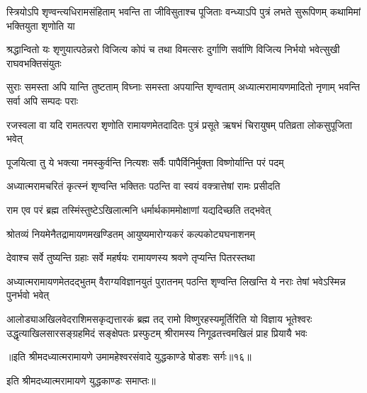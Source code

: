 \fourlineindentedshloka
{स्त्रियोऽपि शृण्वन्त्यधिरामसंहिताम्}
{भवन्ति ता जीविसुताश्च पूजिताः}
{वन्ध्याऽपि पुत्रं लभते सुरूपिणम्}
{कथामिमां भक्तियुता शृणोति या} %

\fourlineindentedshloka
{श्रद्धान्वितो यः शृणुयात्पठेन्नरो}
{विजित्य कोपं च तथा विमत्सरः}
{दुर्गाणि सर्वाणि विजित्य निर्भयो}
{भवेत्सुखी राघवभक्तिसंयुतः} %

\fourlineindentedshloka
{सुराः समस्ता अपि यान्ति तुष्टताम्}
{विघ्नाः समस्ता अपयान्ति शृण्वताम्}
{अध्यात्मरामायणमादितो नृणाम्}
{भवन्ति सर्वा अपि सम्पदः पराः} %

\fourlineindentedshloka
{रजस्वला वा यदि रामतत्परा}
{शृणोति रामायणमेतदादितः}
{पुत्रं प्रसूते ऋषभं चिरायुषम्}
{पतिव्रता लोकसुपूजिता भवेत्} %

\twolineshloka
{पूजयित्वा तु ये भक्त्या नमस्कुर्वन्ति नित्यशः}
{सर्वैः पापैर्विनिर्मुक्ता विष्णोर्यान्ति परं पदम्} %

\twolineshloka
{अध्यात्मरामचरितं कृत्स्नं शृण्वन्ति भक्तितः}
{पठन्ति वा स्वयं वक्त्रात्तेषां रामः प्रसीदति} %

\twolineshloka
{राम एव परं ब्रह्म तस्मिंस्तुष्टेऽखिलात्मनि}
{धर्मार्थकाममोक्षाणां यद्यदिच्छति तद्भवेत्} %

\twolineshloka
{श्रोतव्यं नियमेनैतद्रामायणमखण्डितम्}
{आयुष्यमारोग्यकरं कल्पकोट्यघनाशनम्} %

\twolineshloka
{देवाश्च सर्वे तुष्यन्ति ग्रहाः सर्वे महर्षयः}
{रामायणस्य श्रवणे तृप्यन्ति पितरस्तथा} %

\fourlineindentedshloka
{अध्यात्मरामायणमेतदद्भुतम्}
{वैराग्यविज्ञानयुतं पुरातनम्}
{पठन्ति शृण्वन्ति लिखन्ति ये नराः}
{तेषां भवेऽस्मिन्न पुनर्भवो भवेत्} %

\fourlineindentedshloka
{आलोड्याअखिलवेदराशिमसकृद्यत्तारकं ब्रह्म तद्\-}
{रामो विष्णुरहस्यमूर्तिरिति यो विज्ञाय भूतेश्वरः}
{उद्धृत्याखिलसारसङ्ग्रहमिदं सङ्क्षेपतः प्रस्फुटम्}
{श्रीरामस्य निगूढतत्त्वमखिलं प्राह प्रियायै भवः} %

{॥इति श्रीमदध्यात्मरामायणे उमामहेश्वरसंवादे युद्धकाण्डे षोडशः
सर्गः॥१६॥
}

इति श्रीमदध्यात्मरामायणे युद्धकाण्डः समाप्तः॥